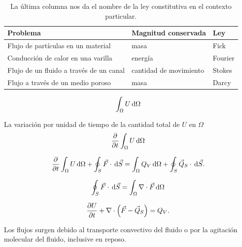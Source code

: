 \begin{table}[ht!]
    \centering
    \begin{tabular}{lll}
        \textbf{Problema}                       &
        \textbf{Magnitud conservada}            & \textbf{Ley} \\
        \hline
        Flujo de partículas en un material      &
        masa                                    & Fick         \\
        \hline
        Conducción de calor en una varilla      &
        energía                                 & Fourier      \\
        \hline
        Flujo de un fluido a través de un canal &
        cantidad de movimiento                  & Stokes       \\
        \hline
        Flujo a través de un medio poroso       &
        masa                                    & Darcy
    \end{tabular}
    \caption[short]{La última columna nos da el nombre de la ley
        constitutiva en el contexto particular.}
\end{table}

\begin{equation*}
    \int_{\Omega}
    U\dl\Omega
\end{equation*}

La variación por unidad de tiempo de la cantidad total de $U$ en $\Omega$
\begin{equation*}
    \diffp{}{t}
    \int_{\Omega}
    U\dl\Omega
\end{equation*}

\begin{equation}
    \diffp{}{t}
    \int_{\Omega}
    U\dl\Omega+
    \oint_{S}
    \vec{F}\cdot\dl{\vec{S}}=
    \int_{\Omega}
    Q_{V}\dl\Omega+
    \oint_{S}
    \vec{Q}_{S}\cdot\dl{\vec{S}}.
\end{equation}

\begin{equation*}
    \oint_{S}
    \vec{F}\cdot\dl{\vec{S}}=
    \int_{\Omega}
    \nabla\cdot\vec{F}\dl\Omega
\end{equation*}

\begin{equation*}
    \diffp{U}{t}+
    \nabla\cdot\left(\vec{F}-\vec{Q}_{S}\right)=
    Q_{V}.
\end{equation*}

Los flujos surgen debido al transporte convectivo del fluido o por la
agitación molecular del fluido, inclusive en reposo.

